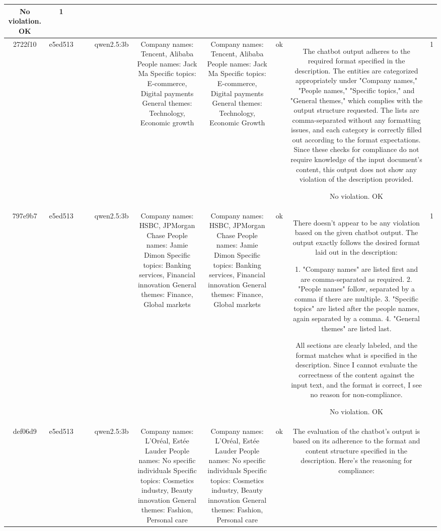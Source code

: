 \begin{table}[h!]
\begin{tabular}{|c|c|c|c|c|c|c|c|c|c|}
No violation.
OK & 1\\
\hline
2722f10 & e5ed513 &  &  & qwen2.5:3b & Company names: Tencent, Alibaba
People names: Jack Ma
Specific topics: E-commerce, Digital payments
General themes: Technology, Economic growth & Company names: Tencent, Alibaba
People names: Jack Ma
Specific topics: E-commerce, Digital payments
General themes: Technology, Economic Growth & ok & The chatbot output adheres to the required format specified in the description. The entities are categorized appropriately under "Company names," "People names," "Specific topics," and "General themes," which complies with the output structure requested. The lists are comma-separated without any formatting issues, and each category is correctly filled out according to the format expectations. Since these checks for compliance do not require knowledge of the input document's content, this output does not show any violation of the description provided.

No violation.
OK & 1\\
\hline
797e9b7 & e5ed513 &  &  & qwen2.5:3b & Company names: HSBC, JPMorgan Chase
People names: Jamie Dimon
Specific topics: Banking services, Financial innovation
General themes: Finance, Global markets & Company names: HSBC, JPMorgan Chase
People names: Jamie Dimon
Specific topics: Banking services, Financial innovation
General themes: Finance, Global markets & ok & There doesn't appear to be any violation based on the given chatbot output. The output exactly follows the desired format laid out in the description:

1. "Company names" are listed first and are comma-separated as required.
2. "People names" follow, separated by a comma if there are multiple.
3. "Specific topics" are listed after the people names, again separated by a comma.
4. "General themes" are listed last.

All sections are clearly labeled, and the format matches what is specified in the description. Since I cannot evaluate the correctness of the content against the input text, and the format is correct, I see no reason for non-compliance.

No violation.
OK & 1\\
\hline
def06d9 & e5ed513 &  &  & qwen2.5:3b & Company names: L'Oréal, Estée Lauder
People names: No specific individuals
Specific topics: Cosmetics industry, Beauty innovation
General themes: Fashion, Personal care & Company names: L'Oréal, Estée Lauder
People names: No specific individuals
Specific topics: Cosmetics industry, Beauty innovation
General themes: Fashion, Personal care & ok & The evaluation of the chatbot's output is based on its adherence to the format and content structure specified in the description. Here's the reasoning for compliance:


\end{tabular}
\end{table}
